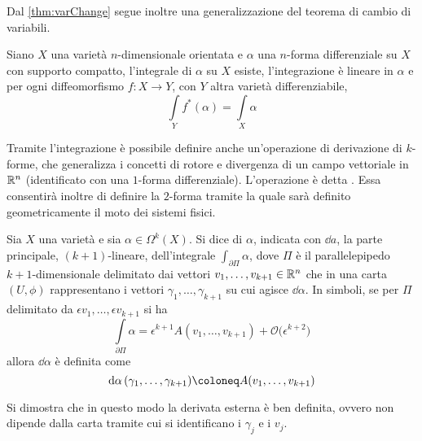 Dal \autoref{thm:varChange} segue inoltre una generalizzazione del teorema di cambio di variabili.
\begin{theorem}
  Siano $X$ una varietà $n$-dimensionale orientata e $\alpha$ una $n$-forma differenziale su $X$ con supporto compatto, l'integrale di $\alpha$ su $X$ esiste, l'integrazione è lineare in $\alpha$ e per ogni diffeomorfismo $f:X\to Y$, con $Y$ altra varietà differenziabile,
  \begin{equation}
  \int\limits_Y f^*(\alpha) = \int\limits_X \alpha
  \end{equation} 
\end{theorem}

Tramite l'integrazione è possibile definire anche un'operazione di derivazione di $k$-forme, che generalizza i concetti di rotore e divergenza di un campo vettoriale in $\mathbb{R}^{n}$ (identificato con una $1$-forma differenziale). L'operazione è detta . Essa consentirà inoltre di definire la $2$-forma tramite la quale sarà definito geometricamente il moto dei sistemi fisici. 
\begin{definition}
  Sia $X$ una varietà e sia $\alpha \in \Omega^k(X)$. Si dice  di $\alpha$, indicata con $\dd{a}$, la parte principale, $(k+1)$-lineare, dell'integrale $\int_{\partial \Pi} \alpha$, dove $\Pi$ è il parallelepipedo $k+1$-dimensionale delimitato dai vettori $v_1, \ldots, v_{k+1} \in \mathbb{R}^{n}$ che in una carta $(U, \phi)$ rappresentano i vettori $\gamma_1, \ldots, \gamma_{k+1}$ su cui agisce $\dd\alpha$. In simboli, se per $\Pi$ delimitato da $\epsilon v_1, \ldots, \epsilon v_{k+1}$ si ha \begin{equation}
    \int\limits_{\partial \Pi} \alpha = \epsilon^{k+1} A(v_1, \ldots, v_{k+1}) + \mathcal{O}\big(\epsilon^{k+2}\big)
  \end{equation}
  allora $\dd\alpha$ è definita come \begin{equation}
  \dd{\alpha}(\gamma_1, \ldots, \gamma_{k+1}) \defeq A(v_1, \ldots, v_{k+1})
  \end{equation} 
\end{definition}
\begin{remark}
  Si dimostra che in questo modo la derivata esterna è ben definita, ovvero non dipende dalla carta tramite cui si identificano i $\gamma_j$ e i $v_j$.
\end{remark}

